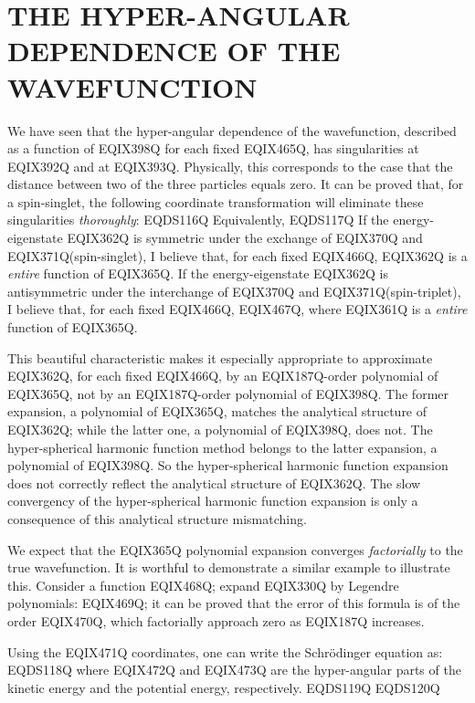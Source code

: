 \section{THE HYPER-ANGULAR DEPENDENCE OF THE WAVEFUNCTION}

We have seen that the hyper-angular dependence of the wavefunction,
described as a function of EQIX398Q for each fixed
EQIX465Q, has
singularities at EQIX392Q and at EQIX393Q. Physically,
this corresponds to the case that the distance between two of the three
particles equals zero. It can be proved that,
for a spin-singlet, the following coordinate
transformation will eliminate these singularities \emph{thoroughly}:
 EQDS116Q 
Equivalently,
 EQDS117Q 
If the energy-eigenstate EQIX362Q is symmetric under the exchange
of EQIX370Q and EQIX371Q(spin-singlet),
I believe that, for each fixed EQIX466Q, EQIX362Q is a \emph{entire}
function of EQIX365Q.
If the energy-eigenstate EQIX362Q is antisymmetric under the interchange
of EQIX370Q and EQIX371Q(spin-triplet), I believe that, for each fixed EQIX466Q,
EQIX467Q, where EQIX361Q is a \emph{entire}
function of EQIX365Q.

This beautiful characteristic makes it especially appropriate to approximate
EQIX362Q, for each fixed EQIX466Q, by an EQIX187Q-order polynomial of EQIX365Q, not by
an EQIX187Q-order polynomial of EQIX398Q. The former expansion, a polynomial
of EQIX365Q, matches the analytical structure of EQIX362Q; while the latter one,
a polynomial of EQIX398Q, does not. The hyper-spherical harmonic
function method belongs to the latter expansion, a polynomial of
EQIX398Q. So the hyper-spherical harmonic function expansion does not
correctly reflect the analytical structure of EQIX362Q. The slow convergency
of the hyper-spherical harmonic function expansion is only a consequence of
this analytical structure mismatching.

We expect that the EQIX365Q polynomial expansion converges \emph{factorially}
to the true wavefunction. It is worthful to demonstrate a similar example
to illustrate this. Consider a function EQIX468Q;
expand EQIX330Q by Legendre polynomials:
EQIX469Q; it can be proved that the error
of this formula is of the order EQIX470Q, which factorially approach zero
as EQIX187Q increases.

Using the EQIX471Q coordinates, one can write the Schr\"{o}dinger
equation as:
 EQDS118Q 
where EQIX472Q and EQIX473Q are the hyper-angular parts of the kinetic energy and
the potential energy, respectively.
 EQDS119Q 
 EQDS120Q 

